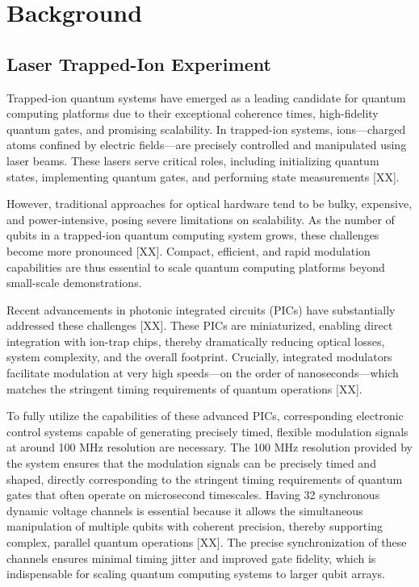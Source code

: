 \chapter{Background}

\section{Laser Trapped-Ion Experiment}

Trapped-ion quantum systems have emerged as a leading candidate for quantum computing platforms due to their exceptional coherence times, high-fidelity quantum gates, and promising scalability. In trapped-ion systems, ions—charged atoms confined by electric fields—are precisely controlled and manipulated using laser beams. These lasers serve critical roles, including initializing quantum states, implementing quantum gates, and performing state measurements [XX].

However, traditional approaches for optical hardware tend to be bulky, expensive, and power-intensive, posing severe limitations on scalability. As the number of qubits in a trapped-ion quantum computing system grows, these challenges become more pronounced [XX]. Compact, efficient, and rapid modulation capabilities are thus essential to scale quantum computing platforms beyond small-scale demonstrations.

Recent advancements in photonic integrated circuits (PICs) have substantially addressed these challenges [XX]. These PICs are miniaturized, enabling direct integration with ion-trap chips, thereby dramatically reducing optical losses, system complexity, and the overall footprint. Crucially, integrated modulators facilitate modulation at very high speeds—on the order of nanoseconds—which matches the stringent timing requirements of quantum operations [XX].

To fully utilize the capabilities of these advanced PICs, corresponding electronic control systems capable of generating precisely timed, flexible modulation signals at around 100 MHz resolution are necessary. The 100 MHz resolution provided by the system ensures that the modulation signals can be precisely timed and shaped, directly corresponding to the stringent timing requirements of quantum gates that often operate on microsecond timescales. Having 32 synchronous dynamic voltage channels is essential because it allows the simultaneous manipulation of multiple qubits with coherent precision, thereby supporting complex, parallel quantum operations [XX]. The precise synchronization of these channels ensures minimal timing jitter and improved gate fidelity, which is indispensable for scaling quantum computing systems to larger qubit arrays.

